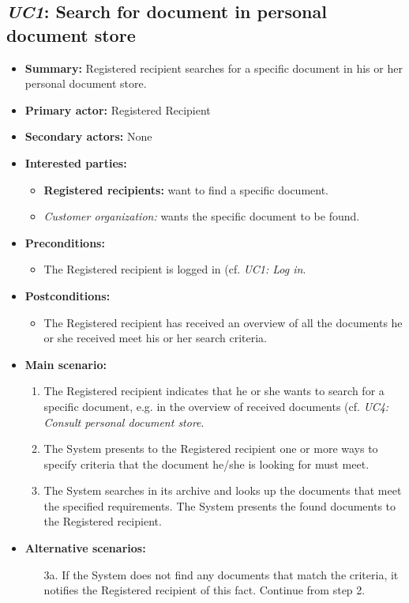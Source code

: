 \documentclass[a4paper,10pt]{article}
\begin{document}
\subsection{\emph{UC1}: Search for document in personal document store}
\begin{itemize}
    \item \textbf{Summary:} Registered recipient searches for a specific document in his or her personal document store. 
    \item \textbf{Primary actor:} Registered Recipient
	\item \textbf{Secondary actors:} None
    \item \textbf{Interested parties:} 
        \begin{itemize}
        	\item \textbf{Registered recipients:} want to find a specific document.
            \item \textit{Customer organization:} wants the specific document to be found.
        \end{itemize}

    \item \textbf{Preconditions:}
        \begin{itemize}
            \item The Registered recipient is logged in (cf. \emph{UC1: Log in}.
        \end{itemize}

    \item \textbf{Postconditions:}
        \begin{itemize}
            \item The Registered recipient has received an overview of all the documents he or she received meet his or her search criteria.
        \end{itemize}
        
    \item \textbf{Main scenario:} 
    \begin{enumerate}
       \item The Registered recipient indicates that he or she wants to search for a specific document, e.g. in the overview of received documents (cf. \emph{UC4: Consult personal document store}.
       \item The System presents to the Registered recipient one or more ways to specify criteria that the document he/she is looking for must meet.
       \item The System searches in its archive and looks up the documents that meet the specified requirements. The System presents the found documents to the Registered recipient.
     \end{enumerate}

    \item \textbf{Alternative scenarios:} 
    \begin{enumerate}
        \item [3a.] If the System does not find any documents that match the criteria, it notifies the Registered recipient of this fact. Continue from step 2.
    \end{enumerate}
\end{itemize}
\end{document}
